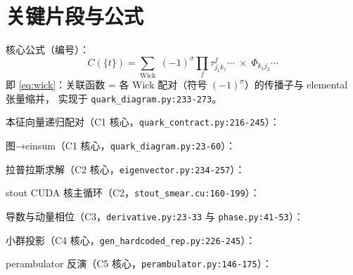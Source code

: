 \documentclass[UTF8]{ctexart}
\begin{document}
\section{关键片段与公式}
核心公式（编号）：
\begin{equation}\label{eq:wick}
  C(\{t\}) = \sum_{\text{Wick}}\; (-1)^{\sigma}\prod_f \tau^{f}_{j_1k_1}\cdots\;\times\;\Phi_{k_1j_2}\cdots
\end{equation}
即 \eqref{eq:wick}：关联函数 = 各 Wick 配对（符号 $(-1)^\sigma$）的传播子与 elemental 张量缩并，
实现于 \texttt{\nolinkurl{quark_diagram.py:233-273}}。

本征向量递归配对（C1 核心，\texttt{\nolinkurl{quark_contract.py:216-245}}）：

图→einsum（C1 核心，\texttt{\nolinkurl{quark_diagram.py:23-60}}）：

拉普拉斯求解（C2 核心，\texttt{\nolinkurl{eigenvector.py:234-257}}）：

stout CUDA 核主循环（C2，\texttt{\nolinkurl{stout_smear.cu:160-199}}）：

导数与动量相位（C3，\texttt{\nolinkurl{derivative.py:23-33}} 与 \texttt{\nolinkurl{phase.py:41-53}}）：


小群投影（C4 核心，\texttt{\nolinkurl{gen_hardcoded_rep.py:226-245}}）：

perambulator 反演（C5 核心，\texttt{\nolinkurl{perambulator.py:146-175}}）：


\end{document}
